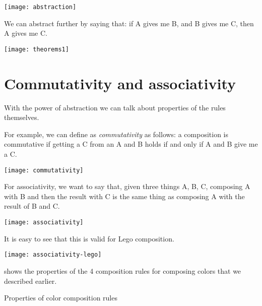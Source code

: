 \begin{center}
  \texttt{[image: abstraction]}
\end{center}


We can abstract further by saying that: if A gives me B, and B gives me C, then A gives me C.

\begin{center}
  \texttt{[image: theorems1]}
\end{center}



\section{Commutativity and associativity}

With the power of abstraction we can talk about properties of the rules themselves.

For example, we can define as \emph{commutativity} as follows: a composition is commutative if getting a C from an A and B holds if and only if A and B give me a C.

\begin{center}
  \texttt{[image: commutativity]}
\end{center}


For associativity, we want to say that, given three things A, B, C, composing A with B and then the result with C is the same thing as composing A with the result of B and C.


\begin{center}
\texttt{[image: associativity]}
\end{center}
It is easy to see that this is valid for Lego composition.

\begin{center}
\texttt{[image: associativity-lego]}
\end{center}

 shows the properties of the 4 composition rules for composing colors that we described earlier.


\begin{table*}\label{tab:color-properties}
  \caption{Properties of color composition rules}
\end{table*}

